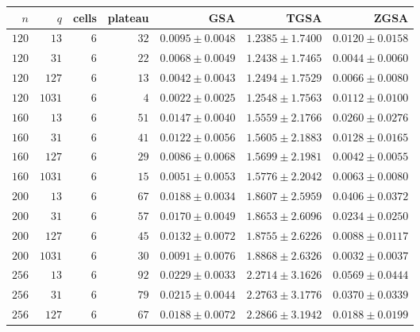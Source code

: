\begin{tabular}{@{}rrrrrrr@{}}
  \toprule
  $n$ & $q$ & cells & plateau & GSA & TGSA & ZGSA \\
  \midrule
  $120$ & $13$ & $6$ & $32$ & $0.0095\mathbin{\pm}0.0048$ & $1.2385\mathbin{\pm}1.7400$ & $0.0120\mathbin{\pm}0.0158$ \\
  $120$ & $31$ & $6$ & $22$ & $0.0068\mathbin{\pm}0.0049$ & $1.2438\mathbin{\pm}1.7465$ & $0.0044\mathbin{\pm}0.0060$ \\
  $120$ & $127$ & $6$ & $13$ & $0.0042\mathbin{\pm}0.0043$ & $1.2494\mathbin{\pm}1.7529$ & $0.0066\mathbin{\pm}0.0080$ \\
  $120$ & $1031$ & $6$ & $4$ & $0.0022\mathbin{\pm}0.0025$ & $1.2548\mathbin{\pm}1.7563$ & $0.0112\mathbin{\pm}0.0100$ \\
  $160$ & $13$ & $6$ & $51$ & $0.0147\mathbin{\pm}0.0040$ & $1.5559\mathbin{\pm}2.1766$ & $0.0260\mathbin{\pm}0.0276$ \\
  $160$ & $31$ & $6$ & $41$ & $0.0122\mathbin{\pm}0.0056$ & $1.5605\mathbin{\pm}2.1883$ & $0.0128\mathbin{\pm}0.0165$ \\
  $160$ & $127$ & $6$ & $29$ & $0.0086\mathbin{\pm}0.0068$ & $1.5699\mathbin{\pm}2.1981$ & $0.0042\mathbin{\pm}0.0055$ \\
  $160$ & $1031$ & $6$ & $15$ & $0.0051\mathbin{\pm}0.0053$ & $1.5776\mathbin{\pm}2.2042$ & $0.0063\mathbin{\pm}0.0080$ \\
  $200$ & $13$ & $6$ & $67$ & $0.0188\mathbin{\pm}0.0034$ & $1.8607\mathbin{\pm}2.5959$ & $0.0406\mathbin{\pm}0.0372$ \\
  $200$ & $31$ & $6$ & $57$ & $0.0170\mathbin{\pm}0.0049$ & $1.8653\mathbin{\pm}2.6096$ & $0.0234\mathbin{\pm}0.0250$ \\
  $200$ & $127$ & $6$ & $45$ & $0.0132\mathbin{\pm}0.0072$ & $1.8755\mathbin{\pm}2.6226$ & $0.0088\mathbin{\pm}0.0117$ \\
  $200$ & $1031$ & $6$ & $30$ & $0.0091\mathbin{\pm}0.0076$ & $1.8868\mathbin{\pm}2.6326$ & $0.0032\mathbin{\pm}0.0037$ \\
  $256$ & $13$ & $6$ & $92$ & $0.0229\mathbin{\pm}0.0033$ & $2.2714\mathbin{\pm}3.1626$ & $0.0569\mathbin{\pm}0.0444$ \\
  $256$ & $31$ & $6$ & $79$ & $0.0215\mathbin{\pm}0.0044$ & $2.2763\mathbin{\pm}3.1776$ & $0.0370\mathbin{\pm}0.0339$ \\
  $256$ & $127$ & $6$ & $67$ & $0.0188\mathbin{\pm}0.0072$ & $2.2866\mathbin{\pm}3.1942$ & $0.0188\mathbin{\pm}0.0199$ \\

\end{tabular}
